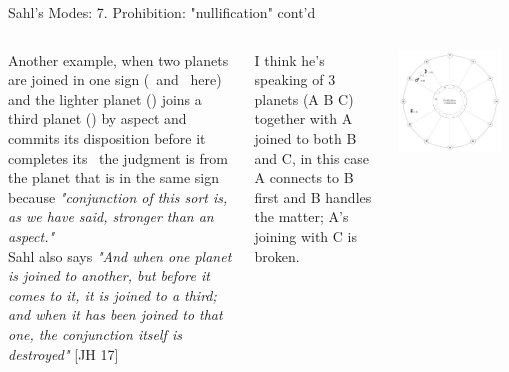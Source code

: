 \begin{frame}[t]{Sahl's Modes: 7. Prohibition: "nullification" cont'd}
\begin{columns}[T, onlytextwidth]
\footnotesize
Another example, when two planets are joined in one sign (\Moon\ and \Mars\ here) and the lighter planet (\Moon) joins a third planet (\Venus) by aspect and commits its disposition before it completes its \Conjunction\, the judgment is from the planet that is in the same sign because \textsl{"conjunction of this sort is, as we have said, stronger than an aspect."} \\
\vspace{0.1cm}
Sahl also says \textsl{"And when one planet is joined to another, but before it comes to it, it is joined to a third; and when it has been joined to that one, the conjunction itself is destroyed"} [JH 17]

\vspace{0.25cm}
I think he's speaking of 3 planets (A B C) together with A joined to both B and C, in this case A connects to B first and B handles the matter; A's joining with C is broken.\footnotemark[1] 

\begin{center}
{\includegraphics[width=0.9\textwidth]{charts/64a-nullification}} \\
\end{center}
\end{columns}
\end{frame}

